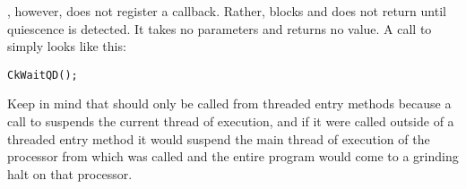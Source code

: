 , however, does not register a callback.  Rather,
 blocks and does not return until quiescence is
detected.  It takes no parameters and returns no value.  A call to
 simply looks like this: 

\begin{alltt}
  CkWaitQD();
\end{alltt}

Keep in mind that  should only be called from threaded
entry methods because a call to  suspends the
current thread of execution, and if it were called outside of a threaded entry
method it would suspend the main thread of execution of the processor from
which  was called and the entire program would come to a grinding
halt on that processor.
